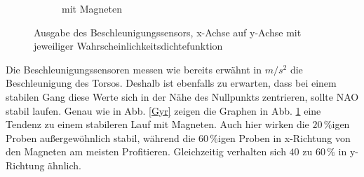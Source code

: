 \begin{figure}[htb]
\begin{adjustwidth}{-0.2\linewidth}{-0.2\linewidth}
\begin{subfigure}[c]{.45\linewidth}
			\caption{mit Magneten}
			\vspace{5pt}
		\end{subfigure}
	\end{adjustwidth}
	\caption{Ausgabe des Beschleunigungssensors, x-Achse auf y-Achse mit jeweiliger Wahrscheinlichkeitsdichtefunktion} \label{Acc}
\end{figure}
Die Beschleunigungssensoren messen wie bereits erwähnt in $\unit{m/s^2}$ die Beschleunigung des Torsos. Deshalb ist ebenfalls zu erwarten, dass bei einem stabilen Gang diese Werte sich in der Nähe des Nullpunkts zentrieren, sollte NAO stabil laufen. Genau wie in Abb. \ref{Gyr} zeigen die Graphen in Abb. \ref{Acc} eine Tendenz zu einem stabileren Lauf mit Magneten. Auch hier wirken die $20\,\%$igen Proben außergewöhnlich stabil, während die $60\,\%$igen Proben in x-Richtung von den Magneten am meisten Profitieren. Gleichzeitig verhalten sich $40$ zu $60\,\%$ in y-Richtung ähnlich. 


